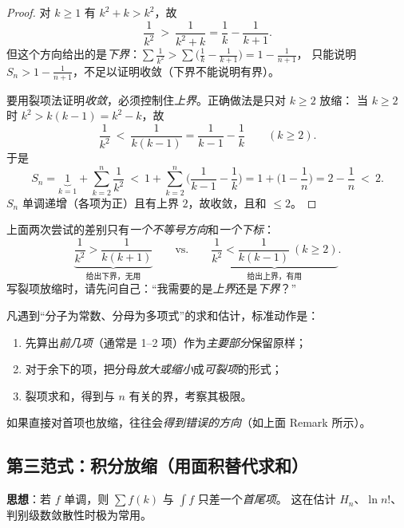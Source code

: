 \documentclass[11pt,a4paper]{ctexart}
\theoremstyle{definition}
\theoremstyle{remark}
\begin{document}
\begin{proof}
对 $k\ge1$ 有 $k^2+k>k^2$，故
\[
  \frac{1}{k^{2}}\ >\ \frac{1}{k^{2}+k}=\frac1k-\frac{1}{k+1}.
\]
但这个方向给出的是\emph{下界}：$\sum\frac1{k^2}>\sum\big(\frac1k-\frac1{k+1}\big)=1-\frac{1}{n+1}$，
只能说明 $S_n>1-\frac1{n+1}$，不足以证明收敛（下界不能说明有界）。

要用裂项法证明\emph{收敛}，必须控制住\emph{上界}。正确做法是只对 $k\ge2$ 放缩：
当 $k\ge2$ 时 $k^{2}>k(k-1)=k^2-k$，故
\[
  \frac{1}{k^{2}}\ <\ \frac{1}{k(k-1)}=\frac{1}{k-1}-\frac1k\qquad(k\ge2).
\]
于是
\[
  S_n=\underbrace{1}_{k=1}+\sum_{k=2}^{n}\frac{1}{k^{2}}
  \ <\ 1+\sum_{k=2}^{n}\Big(\frac{1}{k-1}-\frac1k\Big)
  =1+\Big(1-\frac1n\Big)=2-\frac1n\ <\ 2 .
\]
$S_n$ 单调递增（各项为正）且有上界 $2$，故收敛，且和 $\le 2$。
\end{proof}

\begin{warnbox}
上面两次尝试的差别只有\emph{一个不等号方向}和\emph{一个下标}：
\[
  \underbrace{\frac{1}{k^2}>\frac{1}{k(k+1)}}_{\text{给出下界，无用}}
  \qquad\text{vs.}\qquad
  \underbrace{\frac{1}{k^2}<\frac{1}{k(k-1)}\ (k\ge2)}_{\text{给出上界，有用}}.
\]
写裂项放缩时，请先问自己：“我需要的是\emph{上界}还是\emph{下界}？”
\end{warnbox}

\begin{tipbox}
凡遇到“分子为常数、分母为多项式”的求和估计，标准动作是：
\begin{enumerate}[label=\arabic*.]
  \item 先算出\emph{前几项}（通常是 1--2 项）作为\emph{主要部分}保留原样；
  \item 对于余下的项，把分母\emph{放大或缩小}成\emph{可裂项}的形式；
  \item 裂项求和，得到与 $n$ 有关的界，考察其极限。
\end{enumerate}
如果直接对首项也放缩，往往会\emph{得到错误的方向}（如上面 Remark 所示）。
\end{tipbox}

\subsection{第三范式：积分放缩（用面积替代求和）}

\textbf{思想}：若 $f$ 单调，则 $\sum f(k)$ 与 $\int f$ 只差一个\emph{首尾项}。
这在估计 $H_n$、$\ln n!$、判别级数敛散性时极为常用。
\end{document}
